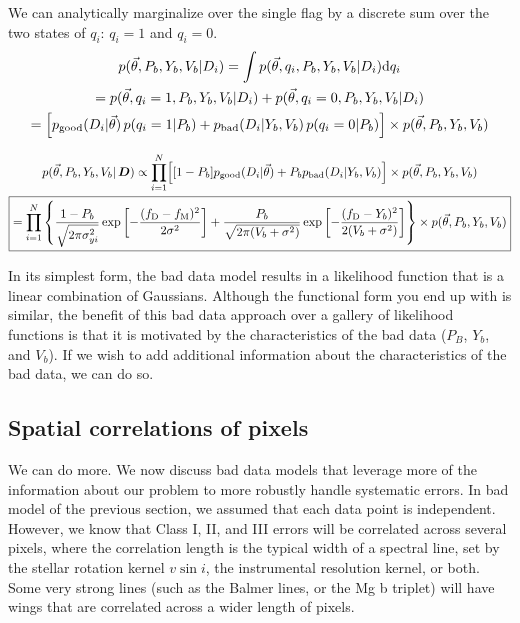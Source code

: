 \documentclass[preprint]{aastex} %
\newcommand{\vt}{\vec{\theta}}
\newcommand{\fM}{f_{\rm M}}
\newcommand{\fD}{f_{\rm D}}
\begin{document}
We can analytically marginalize over the single flag by a discrete sum over the two states of $q_i$: $q_i = 1$ and $q_i = 0$. 
\begin{multline}
  p(\vt, P_b, Y_b, V_b | D_i)  =  \int p( \vt, q_i, P_b, Y_b, V_b| D_i) {\rm d} q_i \\
  = p(\vt, q_i=1, P_b, Y_b, V_b | D_i) + p(\vt, q_i=0, P_b, Y_b, V_b | D_i) \\
  = \Bigl[ p_{\rm good}(D_i | \vt)\, p(q_i=1 | P_b) +  p_{\rm bad}(D_i | Y_b, V_b)\, p(q_i=0 | P_b)\Bigr] \times p(\vt ,P_b, Y_b,V_b) 
\end{multline}

\begin{multline}
  p(\vt,P_b,Y_b,V_b|\,{\bm D}) \propto \prod_{i=1}^N \Bigl [ [1 - P_b] p_{\rm good}(D_i |\vt)  + P_b p_{\rm bad}(D_i | Y_b, V_b)\Bigr ] \times p(\vt,P_b, Y_b, V_b)\\
  \boxed{
    = \prod_{i=1}^N \left\{ \frac{1 - P_b}{\sqrt{2 \pi \sigma_{yi}^2}} \exp \left[ - \frac{(\fD - \fM)^2}{2 \sigma^2} \right] + \frac{P_b}{\sqrt{2 \pi (V_b + \sigma^2)}} \exp \left[- \frac{(\fD - Y_b)^2}{2 (V_b + \sigma^2)} \right] \right\}
  \times p(\vt,P_b,Y_b,V_b)}
\end{multline}

In its simplest form, the bad data model results in a likelihood function that is a linear combination of Gaussians. Although the functional form you end up with is similar, the benefit of this bad data approach over a gallery of likelihood functions is that it is motivated by the characteristics of the bad data ($P_B$, $Y_b$, and $V_b$). If we wish to add additional information about the characteristics of the bad data, we can do so. 

\subsection{Spatial correlations of pixels}
We can do more. We now discuss bad data models that leverage more of the information about our problem to more robustly handle systematic errors. In bad model of the previous section, we assumed that each data point is independent. However, we know that Class I, II, and III errors will be correlated across several pixels, where the correlation length is the typical width of a spectral line, set by the stellar rotation kernel $v \sin i$, the instrumental resolution kernel, or both. Some very strong lines (such as the Balmer lines, or the Mg b triplet) will have wings that are correlated across a wider length of pixels.
\end{document}
